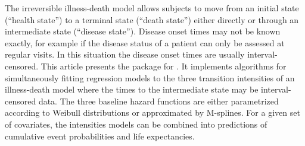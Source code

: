 The irreversible illness-death model allows subjects to move from an
initial state (``health state'') to a terminal state (``death state'')
either directly or through an intermediate state (``disease
state''). Disease onset times may not be known exactly, for example if
the disease status of a patient can only be assessed at regular
visits. In this situation the disease onset times are usually
interval-censored. This article presents the 
package for . It implements algorithms for simultaneously
fitting regression models to the three transition intensities of an
illness-death model where the times to the intermediate state may be
interval-censored data. The three baseline hazard functions are either
parametrized according to Weibull distributions or approximated by
M-splines. For a given set of covariates, the intensities models can
be combined into predictions of cumulative event probabilities and
life expectancies.

